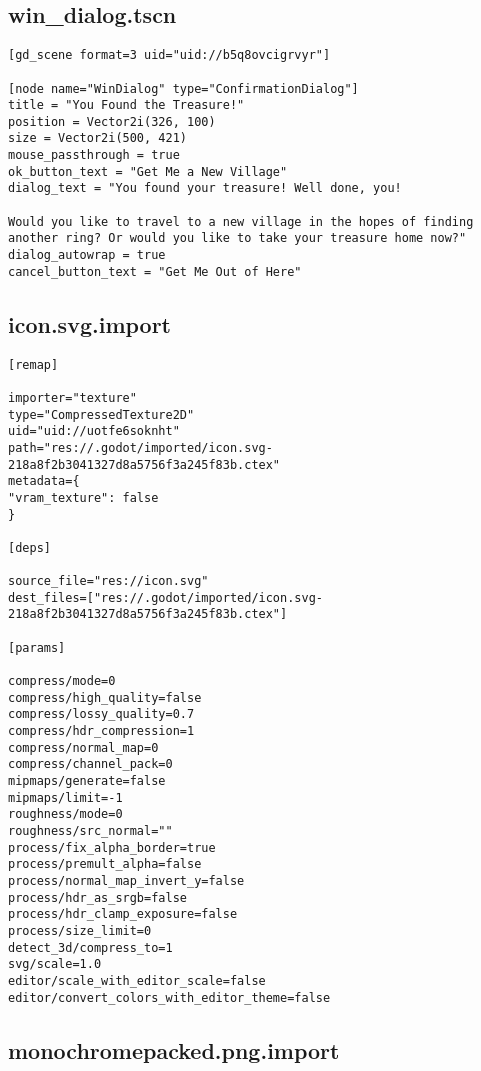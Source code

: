 \subsection{win\_dialog.tscn}

\begin{lstlisting}
[gd_scene format=3 uid="uid://b5q8ovcigrvyr"]

[node name="WinDialog" type="ConfirmationDialog"]
title = "You Found the Treasure!"
position = Vector2i(326, 100)
size = Vector2i(500, 421)
mouse_passthrough = true
ok_button_text = "Get Me a New Village"
dialog_text = "You found your treasure! Well done, you!

Would you like to travel to a new village in the hopes of finding another ring? Or would you like to take your treasure home now?"
dialog_autowrap = true
cancel_button_text = "Get Me Out of Here"
\end{lstlisting}

\subsection{icon.svg.import}

\begin{lstlisting}
[remap]

importer="texture"
type="CompressedTexture2D"
uid="uid://uotfe6soknht"
path="res://.godot/imported/icon.svg-218a8f2b3041327d8a5756f3a245f83b.ctex"
metadata={
"vram_texture": false
}

[deps]

source_file="res://icon.svg"
dest_files=["res://.godot/imported/icon.svg-218a8f2b3041327d8a5756f3a245f83b.ctex"]

[params]

compress/mode=0
compress/high_quality=false
compress/lossy_quality=0.7
compress/hdr_compression=1
compress/normal_map=0
compress/channel_pack=0
mipmaps/generate=false
mipmaps/limit=-1
roughness/mode=0
roughness/src_normal=""
process/fix_alpha_border=true
process/premult_alpha=false
process/normal_map_invert_y=false
process/hdr_as_srgb=false
process/hdr_clamp_exposure=false
process/size_limit=0
detect_3d/compress_to=1
svg/scale=1.0
editor/scale_with_editor_scale=false
editor/convert_colors_with_editor_theme=false
\end{lstlisting}

\subsection{monochrome\textunderscore{}packed.png.import}

